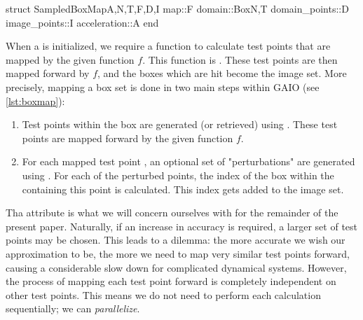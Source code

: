 \begin{minipage}{\linewidth}
\begin{jllisting}[language=julia, style=jlcodestyle]
    struct SampledBoxMap{A,N,T,F,D,I}
        map::F
        domain::Box{N,T}
        domain_points::D
        image_points::I
        acceleration::A
    end
\end{jllisting}
\end{minipage}

When a  is initialized, we require a function to calculate test 
points that are mapped by the given function $f$. This function is . These test 
points are then mapped forward by $f$, and the boxes which are hit become the image set.
More precisely, mapping a box set is done in two main steps within GAIO (see 
\autoref{lst:boxmap}):

\begin{enumerate}
    \item Test points within the box are generated (or retrieved) 
    using . These test points are mapped 
    forward by the given function $f$.
    \item For each mapped test point , an optional set of "perturbations" are 
    generated using . For each of the perturbed points, 
    the index of the box within the  containing this point is calculated. 
    This index gets added to the image set. \\
\end{enumerate}

Tha  attribute is what we will concern ourselves with for the remainder 
of the present paper. Naturally, if an increase in accuracy is required, a larger set of 
test points may be chosen. This leads to a dilemma: the more accurate we wish our 
approximation  to be, the more we need to map very similar test points forward,
causing a considerable slow down for complicated dynamical systems. However, the process of
mapping each test point forward is completely independent on other test points. This means 
we do not need to perform each calculation sequentially; we can \emph{parallelize}. 

